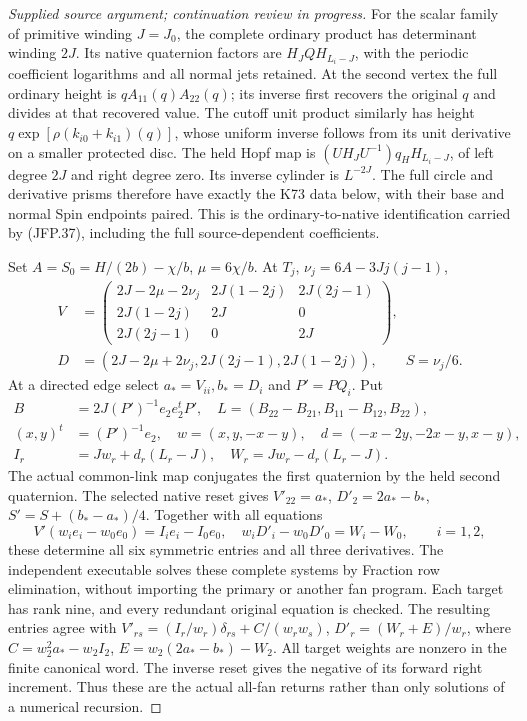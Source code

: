 \begin{proof}[Supplied source argument; continuation review in progress]
For the scalar family of primitive winding \(J=J_0\), the
complete ordinary product has determinant winding \(2J\).
Its native quaternion factors are \(H_J QH_{L_i-J}\), with
the periodic coefficient logarithms and all normal jets retained.
At the second vertex the full ordinary height is
\(qA_{11}(q)A_{22}(q)\); its inverse first recovers the original
\(q\) and divides at that recovered value. The cutoff unit
product similarly has height \(q\exp[\rho(k_{i0}+k_{i1})(q)]\),
whose uniform inverse follows from its unit derivative on a
smaller protected disc. The held Hopf map is
\((UH_JU^{-1})q_HH_{L_i-J}\), of left degree \(2J\) and
right degree zero. Its inverse cylinder is \(L^{-2J}\).
The full circle and derivative prisms therefore have exactly
the K73 data below, with their base and normal Spin endpoints
paired. This is the ordinary-to-native identification carried
by (JFP.37), including the full source-dependent coefficients.

Set \(A=S_0=H/(2b)-\chi/b\), \(\mu=6\chi/b\).
At \(T_j\), \(\nu_j=6A-3Jj(j-1)\),
\[
\begin{split}
 V&=\begin{pmatrix}
 2J-2\mu-2\nu_j&2J(1-2j)&2J(2j-1)\\
 2J(1-2j)&2J&0\\2J(2j-1)&0&2J
 \end{pmatrix},\\
 D&=(2J-2\mu+2\nu_j,2J(2j-1),2J(1-2j)),
 \qquad S=\nu_j/6.
\end{split}
\tag{JFP.41}
\]
At a directed edge select \(a_*=V_{ii},b_*=D_i\) and
\(P'=PQ_i\). Put
\[
\begin{split}
 B&=2J(P')^{-1}e_2e_2^tP',\quad
 L=(B_{22}-B_{21},B_{11}-B_{12},B_{22}),\\
 (x,y)^t&=(P')^{-1}e_2,\quad
 w=(x,y,-x-y),\quad d=(-x-2y,-2x-y,x-y),\\
 I_r&=Jw_r+d_r(L_r-J),\quad W_r=Jw_r-d_r(L_r-J).
\end{split}
\tag{JFP.42}
\]
The actual common-link map conjugates the first quaternion by
the held second quaternion. The selected native reset gives
\(V'_{22}=a_*\), \(D'_2=2a_*-b_*\),
\(S'=S+(b_*-a_*)/4\). Together with all equations
\[
 V'(w_ie_i-w_0e_0)=I_ie_i-I_0e_0,\quad
 w_iD'_i-w_0D'_0=W_i-W_0,\qquad i=1,2,
\tag{JFP.43}
\]
these determine all six symmetric entries and all three
derivatives. The independent executable solves these complete
systems by Fraction row elimination, without importing the
primary or another fan program. Each target has rank nine,
and every redundant original equation is checked. The resulting
entries agree with
\(V'_{rs}=(I_r/w_r)\delta_{rs}+C/(w_rw_s)\),
\(D'_r=(W_r+E)/w_r\), where
\(C=w_2^2a_*-w_2I_2\), \(E=w_2(2a_*-b_*)-W_2\).
All target weights are nonzero in the finite canonical word.
The inverse reset gives the negative of its forward right
increment. Thus these are the actual all-fan returns rather
than only solutions of a numerical recursion.


\end{proof}
